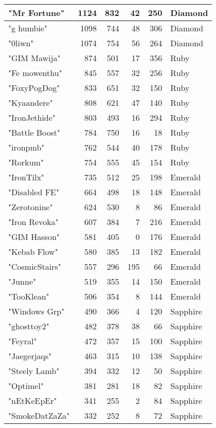 \documentclass{article}
\begin{document}
\begin{table}[htbp]
\begin{tabular}{|l|r|r|r|r|l|}
"Mr Fortune" & 1124 & 832 & 42 & 250 & Diamond \\ \hline
"g humbie" & 1098 & 744 & 48 & 306 & Diamond \\ \hline
"0liwn" & 1074 & 754 & 56 & 264 & Diamond \\ \hline
"GIM Mawija" & 874 & 501 & 17 & 356 & Ruby \\ \hline
"Fe mowenthu" & 845 & 557 & 32 & 256 & Ruby \\ \hline
"FoxyPogDog" & 833 & 651 & 32 & 150 & Ruby \\ \hline
"Kyaandere" & 808 & 621 & 47 & 140 & Ruby \\ \hline
"IronJethide" & 803 & 493 & 16 & 294 & Ruby \\ \hline
"Battle Boost" & 784 & 750 & 16 & 18 & Ruby \\ \hline
"ironpmb" & 762 & 544 & 40 & 178 & Ruby \\ \hline
"Rorkum" & 754 & 555 & 45 & 154 & Ruby \\ \hline
"IronTilx" & 735 & 512 & 25 & 198 & Emerald \\ \hline
"Disabled FE" & 664 & 498 & 18 & 148 & Emerald \\ \hline
"Zerotonine" & 624 & 530 & 8 & 86 & Emerald \\ \hline
"Iron Revoka" & 607 & 384 & 7 & 216 & Emerald \\ \hline
"GIM Hasson" & 581 & 405 & 0 & 176 & Emerald \\ \hline
"Kebab Flow" & 580 & 385 & 13 & 182 & Emerald \\ \hline
"CosmicStairs" & 557 & 296 & 195 & 66 & Emerald \\ \hline
"Junne" & 519 & 355 & 14 & 150 & Emerald \\ \hline
"TooKlean" & 506 & 354 & 8 & 144 & Emerald \\ \hline
"Windows Grp" & 490 & 366 & 4 & 120 & Sapphire \\ \hline
"ghosttoy2" & 482 & 378 & 38 & 66 & Sapphire \\ \hline
"Feyral" & 472 & 357 & 15 & 100 & Sapphire \\ \hline
"Jaegerjaqs" & 463 & 315 & 10 & 138 & Sapphire \\ \hline
"Steely Lamb" & 394 & 332 & 12 & 50 & Sapphire \\ \hline
"Optimel" & 381 & 281 & 18 & 82 & Sapphire \\ \hline
"nEtKeEpEr" & 341 & 255 & 2 & 84 & Sapphire \\ \hline
"SmokeDatZaZa" & 332 & 252 & 8 & 72 & Sapphire \\ \hline

\end{tabular}
\end{table}
\end{document}
